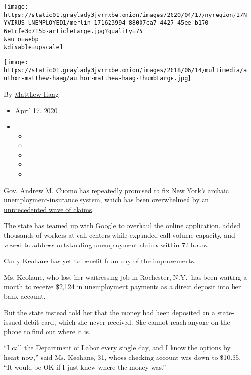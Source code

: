 \texttt{[image: https://static01.graylady3jvrrxbe.onion/images/2020/04/17/nyregion/17NYVIRUS-UNEMPLOYED1/merlin\_171623994\_88007ca7-4427-45ee-b170-6e1cfe3d715b-articleLarge.jpg?quality=75\\\&auto=webp\\\&disable=upscale]}

\href{https://www.nytimes3xbfgragh.onion/by/matthew-haag}{\texttt{[image: https://static01.graylady3jvrrxbe.onion/images/2018/06/14/multimedia/author-matthew-haag/author-matthew-haag-thumbLarge.jpg]}}

By \href{https://www.nytimes3xbfgragh.onion/by/matthew-haag}{Matthew
Haag}

\begin{itemize}
\item
  April 17, 2020
\item
  \begin{itemize}
  \item
  \item
  \item
  \item
  \item
  \end{itemize}
\end{itemize}

Gov. Andrew M. Cuomo has repeatedly promised to fix New York's archaic
unemployment-insurance system, which has been overwhelmed by an
\href{https://www.nytimes3xbfgragh.onion/2020/05/14/business/economy/coronavirus-unemployment-claims.html}{unprecedented
wave of claims}.

The state has teamed up with Google to overhaul the online application,
added thousands of workers at call centers while expanded call-volume
capacity, and vowed to address outstanding unemployment claims within 72
hours.

Carly Keohane has yet to benefit from any of the improvements.

Ms. Keohane, who lost her waitressing job in Rochester, N.Y., has been
waiting a month to receive \$2,124 in unemployment payments as a direct
deposit into her bank account.

But the state instead told her that the money had been deposited on a
state-issued debit card, which she never received. She cannot reach
anyone on the phone to find out where it is.

``I call the Department of Labor every single day, and I know the
options by heart now,'' said Ms. Keohane, 31, whose checking account was
down to \$10.35. ``It would be OK if I just knew where the money was.''

